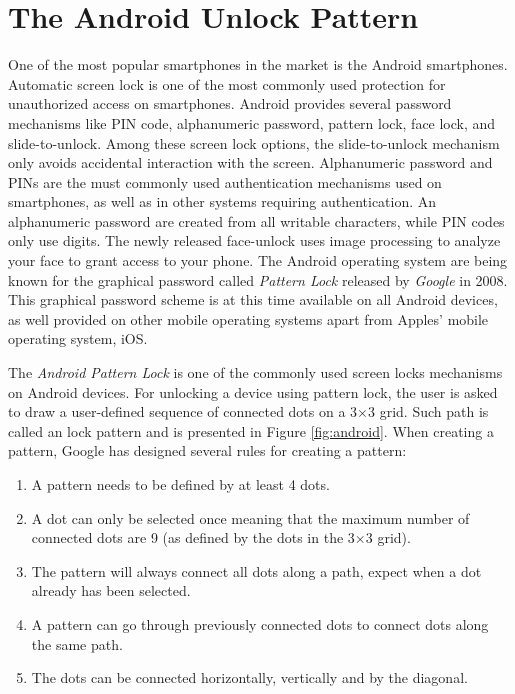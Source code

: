\section{The Android Unlock Pattern}\label{sec:alp}

	One of the most popular smartphones in the market is the Android smartphones. Automatic screen lock is one of the most commonly used protection for unauthorized access on smartphones. Android provides several password mechanisms like PIN code, alphanumeric password, pattern lock, face lock, and slide-to-unlock. Among these screen lock options, the slide-to-unlock mechanism only avoids accidental interaction with the screen. Alphanumeric password and PINs are the must commonly used authentication mechanisms used on smartphones, as well as in other systems requiring authentication. An alphanumeric password are created from all writable characters, while PIN codes only use digits. The newly released face-unlock uses image processing to analyze your face to grant access to your phone. The Android operating system are being known for the graphical password called {\it Pattern Lock} released by {\it Google} in 2008. This graphical password scheme is at this time available on all Android devices, as well provided on other mobile operating systems apart from Apples' mobile operating system, iOS. 

  The {\it Android Pattern Lock} is one of the commonly used screen locks mechanisms on Android devices. For unlocking a device using pattern lock, the user is asked to draw a user-defined sequence of connected dots on a 3$\times$3 grid. Such path is called an lock pattern and is presented in Figure \ref{fig:android}. When creating a pattern, Google has designed several rules for creating a pattern:

  \begin{enumerate}
    \item A pattern needs to be defined by at least 4 dots.
    \item A dot can only be selected once meaning that the maximum number of connected dots are 9 (as defined by the dots in the 3$\times$3 grid).
    \item The pattern will always connect all dots along a path, expect when a dot already has been selected. 
    \item A pattern can go through previously connected dots to connect dots along the same path.
    \item The dots can be connected horizontally, vertically and by the diagonal.
  \end{enumerate}

